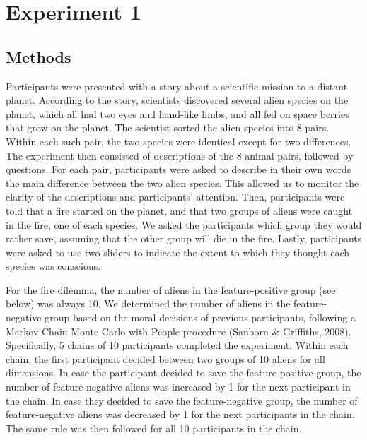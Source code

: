 \documentclass[10pt, letterpaper]{article}
\begin{document}
\hypertarget{experiment-1}{%
\section{Experiment 1}\label{experiment-1}}

\hypertarget{methods}{%
\subsection{Methods}\label{methods}}

Participants were presented with a story about a scientific mission to a
distant planet. According to the story, scientists discovered several
alien species on the planet, which all had two eyes and hand-like limbs,
and all fed on space berries that grow on the planet. The scientist
sorted the alien species into 8 pairs. Within each such pair, the two
species were identical except for two differences. The experiment then
consisted of descriptions of the 8 animal pairs, followed by questions.
For each pair, participants were asked to describe in their own words
the main difference between the two alien species. This allowed us to
monitor the clarity of the descriptions and participants' attention.
Then, participants were told that a fire started on the planet, and that
two groups of aliens were caught in the fire, one of each species. We
asked the participants which group they would rather save, assuming that
the other group will die in the fire. Lastly, participants were asked to
use two sliders to indicate the extent to which they thought each
species was conscious.

For the fire dilemma, the number of aliens in the feature-positive group
(see below) was always 10. We determined the number of aliens in the
feature-negative group based on the moral decisions of previous
participants, following a Markov Chain Monte Carlo with People procedure
(Sanborn \& Griffiths, 2008). Specifically, 5 chains of 10 participants
completed the experiment. Within each chain, the first participant
decided between two groups of 10 aliens for all dimensions. In case the
participant decided to save the feature-positive group, the number of
feature-negative aliens was increased by 1 for the next participant in
the chain. In case they decided to save the feature-negative group, the
number of feature-negative aliens was decreased by 1 for the next
participants in the chain. The same rule was then followed for all 10
participants in the chain.
\end{document}
